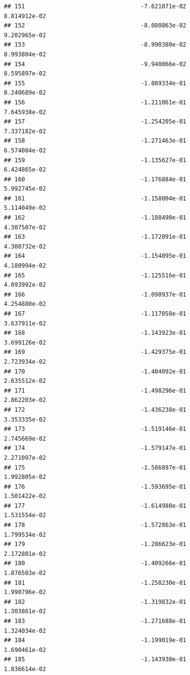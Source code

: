 \documentclass[
]{article}
\begin{document}
\begin{verbatim}
## 151                                 -7.621071e-02           8.814912e-02
## 152                                 -8.080863e-02           9.202965e-02
## 153                                 -8.990380e-02           8.993804e-02
## 154                                 -9.940066e-02           8.595897e-02
## 155                                 -1.089334e-01           8.240689e-02
## 156                                 -1.211061e-01           7.645938e-02
## 157                                 -1.254205e-01           7.337182e-02
## 158                                 -1.271463e-01           6.574084e-02
## 159                                 -1.135627e-01           6.424865e-02
## 160                                 -1.176884e-01           5.992745e-02
## 161                                 -1.158004e-01           5.114049e-02
## 162                                 -1.188490e-01           4.307507e-02
## 163                                 -1.172091e-01           4.300732e-02
## 164                                 -1.154095e-01           4.180994e-02
## 165                                 -1.125516e-01           4.093992e-02
## 166                                 -1.090937e-01           4.254880e-02
## 167                                 -1.117058e-01           3.637911e-02
## 168                                 -1.143923e-01           3.699126e-02
## 169                                 -1.429375e-01           2.723934e-02
## 170                                 -1.404092e-01           2.635512e-02
## 171                                 -1.498296e-01           2.862203e-02
## 172                                 -1.436238e-01           3.353335e-02
## 173                                 -1.519146e-01           2.745669e-02
## 174                                 -1.579147e-01           2.271097e-02
## 175                                 -1.586897e-01           1.992805e-02
## 176                                 -1.593695e-01           1.501422e-02
## 177                                 -1.614980e-01           1.531554e-02
## 178                                 -1.572863e-01           1.799534e-02
## 179                                 -1.286623e-01           2.172881e-02
## 180                                 -1.409266e-01           1.876503e-02
## 181                                 -1.258230e-01           1.990796e-02
## 182                                 -1.319832e-01           1.303861e-02
## 183                                 -1.271688e-01           1.324034e-02
## 184                                 -1.199019e-01           1.690461e-02
## 185                                 -1.143930e-01           1.836614e-02

\end{verbatim}
\end{document}
